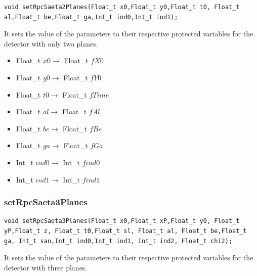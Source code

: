 \documentclass[a4paper]{book}
\begin{document}
\begin{lstlisting}[style=customc]
void setRpcSaeta2Planes(Float_t x0,Float_t y0,Float_t t0, Float_t al,Float_t be,Float_t ga,Int_t ind0,Int_t ind1);
\end{lstlisting}

It sets the value of the parameters to their respective protected variables for the detector with only two planes.

\begin{itemize}
	\item Float\_t $x0 \rightarrow$ Float\_t $fX0$
	\item Float\_t $y0 \rightarrow$ Float\_t $fY0$
	\item Float\_t $t0 \rightarrow$ Float\_t $fTime$
	\item Float\_t $al \rightarrow$ Float\_t $fAl$
	\item Float\_t $be \rightarrow$ Float\_t $fBe$
	\item Float\_t $ga \rightarrow$ Float\_t $fGa$
	\item Int\_t $ind0 \rightarrow$ Int\_t $find0$
	\item Int\_t $ind1 \rightarrow$ Int\_t $find1$
\end{itemize}

\subsubsection{setRpcSaeta3Planes}

\begin{lstlisting}[style=customc]
void setRpcSaeta3Planes(Float_t x0,Float_t xP,Float_t y0, Float_t yP,Float_t z, Float_t t0,Float_t sl, Float_t al, Float_t be,Float_t ga, Int_t san,Int_t ind0,Int_t ind1, Int_t ind2, Float_t chi2);
\end{lstlisting}

It sets the value of the parameters to their respective protected variables for the detector with three planes.
\end{document}
